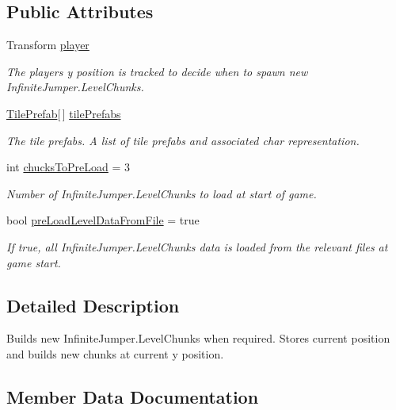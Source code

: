 \subsection*{Public Attributes}
\begin{DoxyCompactItemize}
\item 
Transform \hyperlink{class_infinite_jumper_1_1_level_chunk_manager_a22cad8b920dcb4f6089c5c831186e8d2}{player}
\begin{DoxyCompactList}\small\item\em The players y position is tracked to decide when to spawn new Infinite\+Jumper.\+Level\+Chunks. \end{DoxyCompactList}\item 
\hyperlink{class_infinite_jumper_1_1_tile_prefab}{Tile\+Prefab}\mbox{[}$\,$\mbox{]} \hyperlink{class_infinite_jumper_1_1_level_chunk_manager_a0665ca9547c77c3818c123194d3f6016}{tile\+Prefabs}
\begin{DoxyCompactList}\small\item\em The tile prefabs. A list of tile prefabs and associated char representation. \end{DoxyCompactList}\item 
int \hyperlink{class_infinite_jumper_1_1_level_chunk_manager_a8bd3df227bc8c78ee532528f16587461}{chucks\+To\+Pre\+Load} = 3
\begin{DoxyCompactList}\small\item\em Number of Infinite\+Jumper.\+Level\+Chunks to load at start of game. \end{DoxyCompactList}\item 
bool \hyperlink{class_infinite_jumper_1_1_level_chunk_manager_ac1b5eb925b24bb196a194e09723b6f09}{pre\+Load\+Level\+Data\+From\+File} = true
\begin{DoxyCompactList}\small\item\em If true, all Infinite\+Jumper.\+Level\+Chunks data is loaded from the relevant files at game start. \end{DoxyCompactList}\end{DoxyCompactItemize}


\subsection{Detailed Description}
Builds new Infinite\+Jumper.\+Level\+Chunks when required. Stores current position and builds new chunks at current y position. 



\subsection{Member Data Documentation}
\hypertarget{class_infinite_jumper_1_1_level_chunk_manager_a8bd3df227bc8c78ee532528f16587461}{}
